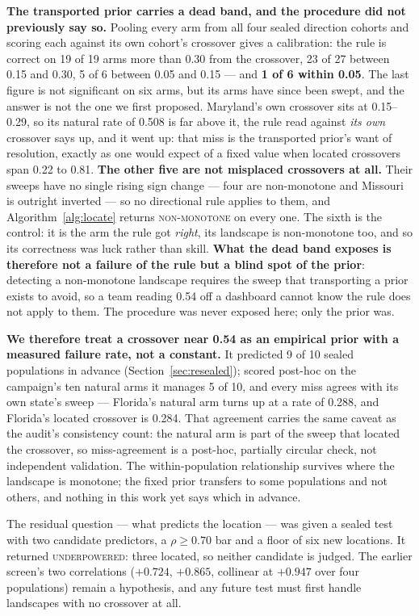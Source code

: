\documentclass[9pt,conference]{IEEEtran}
\begin{document}
\textbf{The transported prior carries a dead band, and the procedure did not previously
say so.} Pooling every arm from all four sealed direction cohorts and scoring each against
its own cohort's crossover gives a calibration: the rule is correct on 19 of 19 arms more
than 0.30 from the crossover, 23 of 27 between 0.15 and 0.30, 5 of 6 between 0.05 and 0.15
--- and \textbf{1 of 6 within 0.05}. The last figure is not significant on six arms, but its
arms have since been swept, and the answer is not the one we first proposed. Maryland's own
crossover sits at 0.15--0.29, so its natural rate of 0.508 is far above it, the rule read
against \emph{its own} crossover says up, and it went up: that miss is the transported
prior's want of resolution, exactly as one would expect of a fixed value when located crossovers span 0.22 to 0.81. \textbf{The other five are not misplaced crossovers at all.}
Their sweeps have no single rising sign change --- four are non-monotone and Missouri is
outright inverted --- so no directional rule applies to them, and
Algorithm~\ref{alg:locate} returns \textsc{non-monotone} on every one. The sixth is the
control: it is the arm the rule got \emph{right}, its landscape is non-monotone too, and so
its correctness was luck rather than skill. \textbf{What the dead band exposes is therefore
not a failure of the rule but a blind spot of the prior}: detecting a non-monotone landscape
requires the sweep that transporting a prior exists to avoid, so a team reading 0.54 off a
dashboard cannot know the rule does not apply to them. The procedure was never exposed here;
only the prior was.

\textbf{We therefore treat a crossover near 0.54 as an empirical prior with a measured
failure rate, not a constant.} It predicted 9 of 10 sealed populations in advance
(Section~\ref{sec:resealed}); scored post-hoc on the campaign's ten natural arms it manages
5 of 10, and every miss agrees with its own state's sweep --- Florida's natural arm turns up
at a rate of 0.288, and Florida's located crossover is 0.284. That agreement carries the
same caveat as the audit's consistency count: the natural arm is part of the sweep that
located the crossover, so miss-agreement is a post-hoc, partially circular check, not
independent validation. The within-population
relationship survives where the landscape is monotone; the fixed prior transfers to some
populations and not others, and nothing in this work yet says which in advance.

The residual question --- what predicts the location --- was given a sealed test with two
candidate predictors, a $\rho \geq 0.70$ bar and a floor of six new locations. It returned
\textsc{underpowered}: three located, so neither candidate is judged. The earlier screen's
two correlations ($+0.724$, $+0.865$, collinear at $+0.947$ over four populations) remain a
hypothesis, and any future test must first handle landscapes with no crossover at all.
\end{document}
